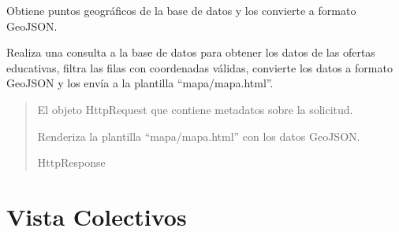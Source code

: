 \documentclass[letterpaper,10pt,spanish]{sphinxmanual}
\begin{document}
\begin{fulllineitems}

\pysigstartsignatures
{}
\pysigstopsignatures
\sphinxAtStartPar
Obtiene puntos geográficos de la base de datos y los convierte a formato GeoJSON.

\sphinxAtStartPar
Realiza una consulta a la base de datos para obtener los datos de
las ofertas educativas, filtra las filas con coordenadas válidas,
convierte los datos a formato GeoJSON y los envía a la plantilla “mapa/mapa.html”.
\begin{quote}\begin{description}
\sphinxAtStartPar
{} \textendash{} El objeto HttpRequest que contiene metadatos sobre la solicitud.

\sphinxAtStartPar
Renderiza la plantilla “mapa/mapa.html” con los datos GeoJSON.

\sphinxAtStartPar
HttpResponse

\end{description}\end{quote}

\end{fulllineitems}



\section{Vista Colectivos}
\label{\detokenize{mapas:vista-colectivos}}
\end{document}
